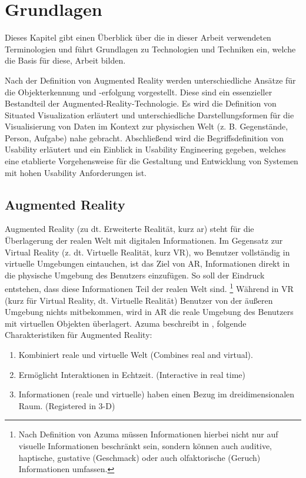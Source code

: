 \chapter{Grundlagen} \label{CapterFundamentals}

Dieses Kapitel gibt einen Überblick über die in dieser Arbeit verwendeten Terminologien und führt Grundlagen zu Technologien und Techniken ein, welche die Basis für diese, Arbeit bilden. 

Nach der Definition von Augmented Reality werden unterschiedliche Ansätze für die Objekterkennung und -erfolgung vorgestellt.  
Diese sind ein essenzieller Bestandteil der Augmented-Reality-Technologie. Es wird die Definition von Situated Visualization erläutert 
und unterschiedliche Darstellungsformen für die Visualisierung von Daten im Kontext zur physischen Welt (z. B. Gegenstände, Person, Aufgabe) nahe gebracht. 
Abschließend wird die Begriffsdefinition von Usability erläutert und ein Einblick in Usability Engineering gegeben, welches eine etablierte Vorgehensweise für die 
Gestaltung und Entwicklung von Systemen mit hohen Usability Anforderungen ist. 

\section{Augmented Reality}

Augmented Reality (zu dt. Erweiterte Realität, kurz \gls{ar}) steht für die Überlagerung der realen Welt mit digitalen Informationen. \cite{Azuma1997,DieterSchmalstieg2016} Im Gegensatz zur Virtual Reality (z. dt. Virtuelle Realität, kurz VR), wo Benutzer vollständig in virtuelle Umgebungen eintauchen,
ist das Ziel von AR, Informationen direkt in die physische Umgebung des Benutzers einzufügen. So soll der Eindruck entstehen, dass diese Informationen Teil der realen Welt sind. \footnote{Nach Definition von Azuma  müssen Informationen hierbei nicht nur auf visuelle Informationen beschränkt sein, 
sondern können auch auditive, haptische, gustative (Geschmack) oder auch olfaktorische (Geruch) Informationen umfassen.} \cite{Azuma1997} Während in VR (kurz für Virtual Reality, dt. Virtuelle Realität) Benutzer von der äußeren Umgebung nichts mitbekommen, wird in AR die reale Umgebung des Benutzers mit virtuellen 
Objekten überlagert. Azuma beschreibt in \cite{Azuma1997}, folgende Charakteristiken für Augmented Reality: 

\begin{enumerate}
	\item Kombiniert reale und virtuelle Welt (Combines real and virtual).
	\item Ermöglicht Interaktionen in Echtzeit. (Interactive in real time)
	\item Informationen (reale und virtuelle) haben einen Bezug im dreidimensionalen Raum. (Registered in 3-D)
\end{enumerate}

